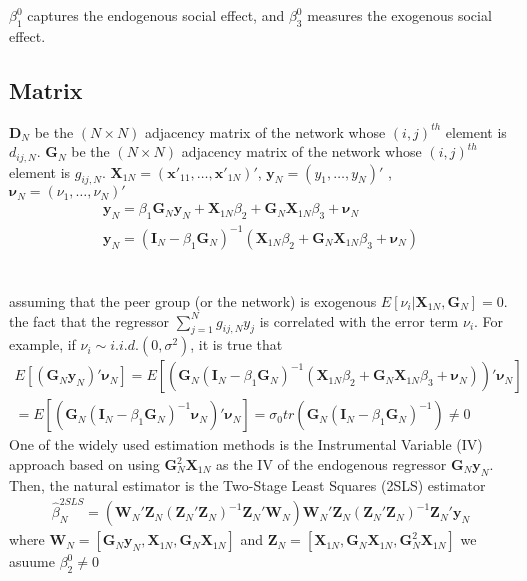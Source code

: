 \documentclass[11pt]{article}
\begin{document}
$\beta_{1}^0$ captures the endogenous social effect, and $\beta_{3}^0$ measures the exogenous social effect.
\subsection{Matrix} 

$ \mathbf{D}_{N}$ be the $(N \times N)$  adjacency matrix of the network whose $(i, j)^{th}$ element is $d_{ij,N}$.
$ \mathbf{G}_{N}$ be the $(N \times N)$  adjacency matrix of the network whose $(i, j)^{th}$ element is $g_{ij,N}$.
$ \mathbf{X}_{1N} = (\mathbf{x'}_{11}, \dots ,\mathbf{x'}_{1N})' $, 
$ \mathbf{y}_{N} = (y_{1}, \dots ,y_{N})' $ ,
$ \boldsymbol{\nu}_{N} = (\nu_{1}, \dots ,\nu_{N})' $
  \begin{align}
\mathbf{y}_{N} = \beta_{1}\mathbf{G}_{N}\mathbf{y}_{N} + \mathbf{X}_{1N}\beta_{2} + \mathbf{G}_{N}\mathbf{X}_{1N}\beta_{3} + \boldsymbol{\nu}_{N} \\
\mathbf{y}_{N} = (\mathbf{I}_{N} - \beta_{1}\mathbf{G}_{N})^{-1}(\mathbf{X}_{1N}\beta_{2} + \mathbf{G}_{N}\mathbf{X}_{1N}\beta_{3} + \boldsymbol{\nu}_{N} )
  \end{align}
\\
\\

assuming that the peer group (or the network) is exogenous $E[\nu_{i}|\mathbf{X}_{1N} , \mathbf{G}_{N} ] = 0 $. the fact that the regressor $\sum\limits_{j=1}^N g_{ij,N}y_{j}$ is correlated with the error term $\nu_{i}$. For example, if $\nu_{i} \sim i.i.d.(0, \sigma^2)$, it is true that
  \begin{align}
E[(\mathbf{G}_{N}\mathbf{y}_{N})'\boldsymbol{\nu}_{N}] = E[(\mathbf{G}_{N}(\mathbf{I}_{N} - \beta_{1}\mathbf{G}_{N})^{-1}(\mathbf{X}_{1N}\beta_{2} + \mathbf{G}_{N}\mathbf{X}_{1N}\beta_{3} + \boldsymbol{\nu}_{N} ))'\boldsymbol{\nu}_{N}]\\
= E[(\mathbf{G}_{N}(\mathbf{I}_{N} - \beta_{1}\mathbf{G}_{N})^{-1}\boldsymbol{\nu}_{N})'\boldsymbol{\nu}_{N}] = \sigma_{0}tr(\mathbf{G}_{N}(\mathbf{I}_{N} - \beta_{1}\mathbf{G}_{N})^{-1}) \neq 0
  \end{align}
One of the widely used estimation methods is the Instrumental Variable (IV) approach based on using $\mathbf{G}_{N}^2\mathbf{X}_{1N}$ as the IV of the endogenous regressor $\mathbf{G}_{N}\mathbf{y}_{N}$. Then, the natural estimator is the Two-Stage Least Squares (2SLS) estimator
  \begin{align}
\hat{\beta}_{N}^{2SLS} = (\mathbf{W}_{N}'\mathbf{Z}_{N}(\mathbf{Z}_{N}'\mathbf{Z}_{N})^{-1}\mathbf{Z}_{N}'\mathbf{W}_{N})\mathbf{W}_{N}'\mathbf{Z}_{N}(\mathbf{Z}_{N}'\mathbf{Z}_{N})^{-1}\mathbf{Z}_{N}'\mathbf{y}_{N}
  \end{align}
where $\mathbf{W}_{N} = [\mathbf{G}_{N}\mathbf{y}_{N},\mathbf{X}_{1N} ,\mathbf{G}_{N}\mathbf{X}_{1N} ]$ and 
$\mathbf{Z}_{N} = [\mathbf{X}_{1N} , \mathbf{G}_{N}\mathbf{X}_{1N} , \mathbf{G}_{N}^2\mathbf{X}_{1N}]$ we asuume $\beta_{2}^0 \neq 0$
\end{document}
